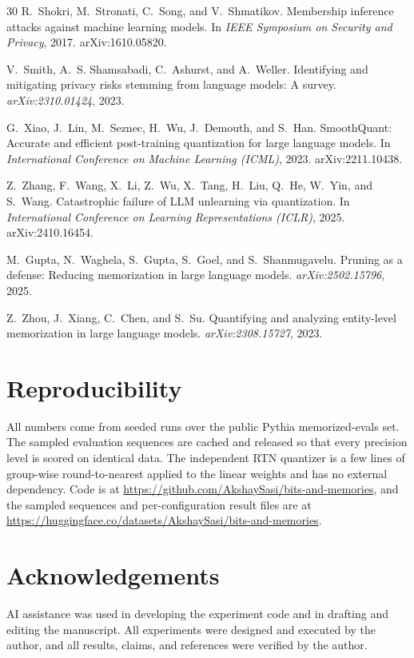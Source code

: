 \documentclass{article}
\begin{document}
\begin{thebibliography}{30}
R.~Shokri, M.~Stronati, C.~Song, and V.~Shmatikov.
\newblock Membership inference attacks against machine learning models.
\newblock In \emph{IEEE Symposium on Security and Privacy}, 2017.
  arXiv:1610.05820.

V.~Smith, A.~S. Shamsabadi, C.~Ashurst, and A.~Weller.
\newblock Identifying and mitigating privacy risks stemming from language
  models: A survey.
\newblock \emph{arXiv:2310.01424}, 2023.

G.~Xiao, J.~Lin, M.~Seznec, H.~Wu, J.~Demouth, and S.~Han.
\newblock SmoothQuant: Accurate and efficient post-training quantization for
  large language models.
\newblock In \emph{International Conference on Machine Learning (ICML)}, 2023.
  arXiv:2211.10438.

Z.~Zhang, F.~Wang, X.~Li, Z.~Wu, X.~Tang, H.~Liu, Q.~He, W.~Yin, and S.~Wang.
\newblock Catastrophic failure of LLM unlearning via quantization.
\newblock In \emph{International Conference on Learning Representations
  (ICLR)}, 2025. arXiv:2410.16454.

M.~Gupta, N.~Waghela, S.~Gupta, S.~Goel, and S.~Shanmugavelu.
\newblock Pruning as a defense: Reducing memorization in large language
  models.
\newblock \emph{arXiv:2502.15796}, 2025.

Z.~Zhou, J.~Xiang, C.~Chen, and S.~Su.
\newblock Quantifying and analyzing entity-level memorization in large
  language models.
\newblock \emph{arXiv:2308.15727}, 2023.

\end{thebibliography}

\appendix

\section{Reproducibility}

All numbers come from seeded runs over the public Pythia memorized-evals set.
The sampled evaluation sequences are cached and released so that every
precision level is scored on identical data. The independent RTN quantizer is
a few lines of group-wise round-to-nearest applied to the linear weights and
has no external dependency. Code is at
\url{https://github.com/AkshaySasi/bits-and-memories}, and the sampled
sequences and per-configuration result files are at
\url{https://huggingface.co/datasets/AkshaySasi/bits-and-memories}.

\section*{Acknowledgements}

AI assistance was used in developing the experiment code and in drafting and
editing the manuscript. All experiments were designed and executed by the
author, and all results, claims, and references were verified by the author.
\end{document}
